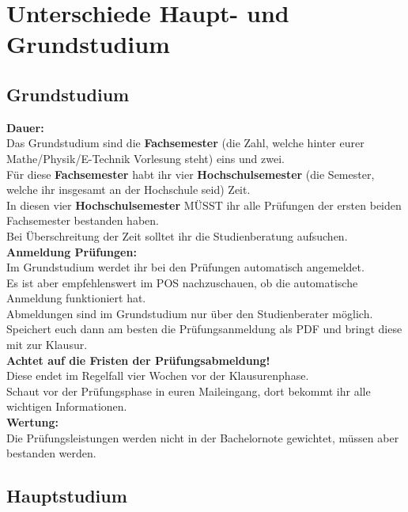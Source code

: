 \chapter{Unterschiede Haupt- und Grundstudium}


%


\section{Grundstudium}

\textbf{Dauer:}\\
Das Grundstudium sind die \textbf{Fachsemester} (die Zahl, welche hinter eurer Mathe/Physik/E-Technik Vorlesung steht) eins und zwei.\\
Für diese \textbf{Fachsemester} habt ihr vier \textbf{Hochschulsemester} (die Semester, welche ihr insgesamt an der Hochschule seid) Zeit.\\
In diesen vier \textbf{Hochschulsemester} MÜSST ihr alle Prüfungen der ersten beiden Fachsemester bestanden haben.\\
Bei Überschreitung der Zeit solltet ihr die Studienberatung aufsuchen.\\

\textbf{Anmeldung Prüfungen:}\\
Im Grundstudium werdet ihr bei den Prüfungen automatisch angemeldet.\\
Es ist aber empfehlenswert im POS nachzuschauen, ob die automatische Anmeldung funktioniert hat.\\
Abmeldungen sind im Grundstudium nur über den Studienberater möglich.\\
Speichert euch dann am besten die Prüfungsanmeldung als PDF und bringt diese mit zur Klausur.\\
\textbf{Achtet auf die Fristen der Prüfungsabmeldung!}\\ %
Diese endet im Regelfall vier Wochen vor der Klausurenphase.\\
Schaut vor der Prüfungsphase in euren Maileingang, dort bekommt ihr alle wichtigen Informationen.\\

\textbf{Wertung:}\\
Die Prüfungsleistungen werden nicht in der Bachelornote gewichtet, müssen aber bestanden werden.\\ 

\section{Hauptstudium}

